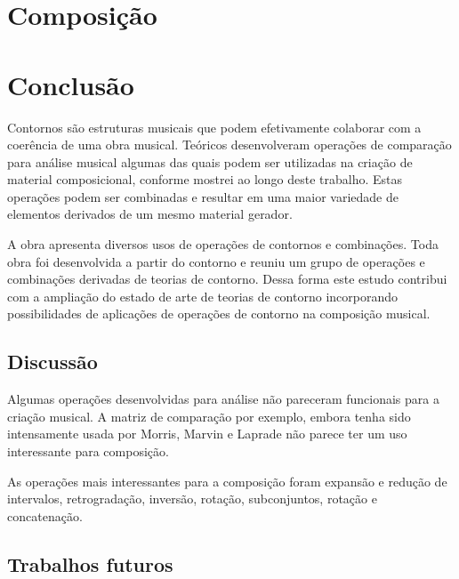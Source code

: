\chapter{Composição}
\label{cha:composicao}



\chapter{Conclusão}
\label{cha:conclusao}

Contornos são estruturas musicais que podem efetivamente colaborar com
a coerência de uma obra musical. Teóricos desenvolveram operações de
comparação para análise musical algumas das quais podem ser utilizadas
na criação de material composicional, conforme mostrei ao longo deste
trabalho. Estas operações podem ser combinadas e resultar em uma maior
variedade de elementos derivados de um mesmo material gerador.

A obra \obra{} apresenta diversos usos de operações de contornos e
combinações. Toda obra foi desenvolvida a partir do contorno \contpr{}
e reuniu um grupo de operações e combinações derivadas de teorias de
contorno. Dessa forma este estudo contribui com a ampliação do estado
de arte de teorias de contorno incorporando possibilidades de
aplicações de operações de contorno na composição musical.

\section{Discussão}
\label{sec:discussao}


Algumas operações desenvolvidas para análise não pareceram funcionais
para a criação musical. A matriz de comparação por exemplo, embora
tenha sido intensamente usada por Morris, Marvin e Laprade não parece
ter um uso interessante para composição.


As operações mais interessantes para a composição foram expansão e
redução de intervalos, retrogradação, inversão, rotação, subconjuntos,
rotação e concatenação.

\section{Trabalhos futuros}
\label{sec:trabalhos-futuros}


